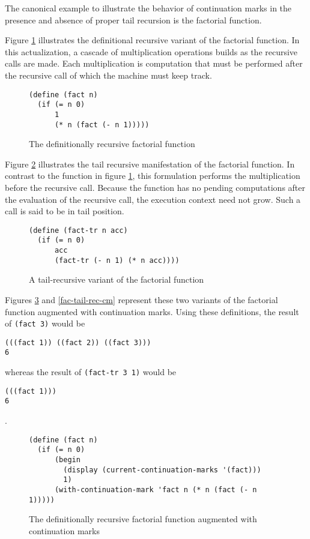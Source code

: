 \documentclass[11pt,ms]{byuprop}
\newcounter{definition}
\newcounter{example}
\begin{document}
The canonical example to illustrate the behavior of continuation marks in the presence and
absence of proper tail recursion is the factorial function.

Figure \ref{fac-rec} illustrates the definitional recursive variant of the factorial
function. In this actualization, a cascade of multiplication operations builds as the
recursive calls are made. Each multiplication is computation that must be performed after
the recursive call of which the machine must keep track.

\begin{figure}
\begin{verbatim}
(define (fact n)
  (if (= n 0)
      1
      (* n (fact (- n 1)))))
\end{verbatim}
\caption{The definitionally recursive factorial function}
\label{fac-rec}
\end{figure}

Figure \ref{fac-tail-rec} illustrates the tail recursive manifestation of the factorial
function. In contrast to the function in figure \ref{fac-rec}, this formulation performs
the multiplication before the recursive call. Because the function has no pending
computations after the evaluation of the recursive call, the execution context need not
grow. Such a call is said to be in tail position.

\begin{figure}
\begin{verbatim}
(define (fact-tr n acc)
  (if (= n 0)
      acc
      (fact-tr (- n 1) (* n acc))))
\end{verbatim}
\caption{A tail-recursive variant of the factorial function}
\label{fac-tail-rec}
\end{figure}

Figures \ref{fac-rec-cm} and \ref{fac-tail-rec-cm} represent these two variants of the
factorial function augmented with continuation marks. Using these definitions, the 
result of \texttt{(fact 3)} would be

\begin{verbatim}
(((fact 1)) ((fact 2)) ((fact 3)))
6
\end{verbatim}

whereas the result of \texttt{(fact-tr 3 1)} would be

\begin{verbatim}
(((fact 1)))
6
\end{verbatim}.

\begin{figure}
\begin{verbatim}
(define (fact n)
  (if (= n 0)
      (begin
        (display (current-continuation-marks '(fact)))
        1)
      (with-continuation-mark 'fact n (* n (fact (- n 1)))))
\end{verbatim}
\caption{The definitionally recursive factorial function augmented with continuation marks}
\label{fac-rec-cm}
\end{figure}
\end{document}
